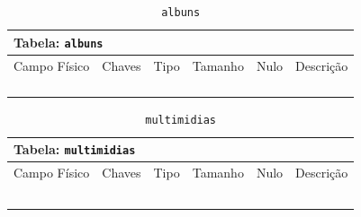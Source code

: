 \documentclass[12pt,a4paper]{article}
\begin{document}
\begin{center}
\begin{table}[h!]
	\caption{\texttt{albuns}}
	\label{tabela:albuns}
	\begin{tabular}{|p{2.5cm}|p{1cm}|p{1.25cm}|p{1.75cm}|p{1.25cm}|p{5cm}|}\hline	
		\multicolumn{6}{|p{16cm}|}{\cellcolor{cinzaClaro}  \centering Tabela: \texttt{albuns}} \\ \hline %
		{\small Campo Físico}   & {\small Chaves} & {\small Tipo} & {\small Tamanho} & {\small Nulo} & {\small Descrição}\\\hline %
		
		{\tiny } & {\tiny } & {\tiny } & {\tiny } & {\tiny } &{\tiny }\\\hline
		{\tiny } & {\tiny } & {\tiny } & {\tiny } & {\tiny } &{\tiny }\\\hline
		{\tiny } & {\tiny } & {\tiny } & {\tiny } & {\tiny } &{\tiny }\\\hline
		{\tiny } & {\tiny } & {\tiny } & {\tiny } & {\tiny } &{\tiny }\\\hline
			
	\end{tabular}
\end{table}	
\end{center}


\begin{center}
\begin{table}[h!]
	\caption{\texttt{multimidias}}
	\label{tabela:multimidias}
	\begin{tabular}{|p{2.5cm}|p{1cm}|p{1.25cm}|p{1.75cm}|p{1.25cm}|p{5cm}|}\hline	
		\multicolumn{6}{|p{16cm}|}{\cellcolor{cinzaClaro}  \centering Tabela: \texttt{multimidias}} \\ \hline %
		{\small Campo Físico}   & {\small Chaves} & {\small Tipo} & {\small Tamanho} & {\small Nulo} & {\small Descrição}\\\hline %
		
		{\tiny } & {\tiny } & {\tiny } & {\tiny } & {\tiny } &{\tiny }\\\hline
		{\tiny } & {\tiny } & {\tiny } & {\tiny } & {\tiny } &{\tiny }\\\hline
		{\tiny } & {\tiny } & {\tiny } & {\tiny } & {\tiny } &{\tiny }\\\hline
		{\tiny } & {\tiny } & {\tiny } & {\tiny } & {\tiny } &{\tiny }\\\hline
		{\tiny } & {\tiny } & {\tiny } & {\tiny } & {\tiny } &{\tiny }\\\hline
			
	\end{tabular}
\end{table}	
\end{center}
\end{document}
